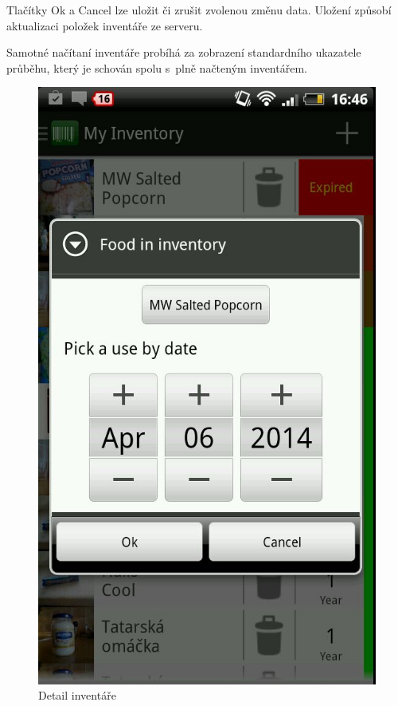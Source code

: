 \documentclass[thesis=B,czech]{FITthesis}[2013/10/20]
\begin{document}
Tlačítky Ok a Cancel lze uložit či zrušit zvolenou změnu data. Uložení způsobí aktualizaci položek inventáře ze serveru.

Samotné načítaní inventáře probíhá za zobrazení standardního ukazatele průběhu, který je schován spolu s~plně načteným inventářem.

\begin{figure}[H]
  \centering
  \includegraphics[scale=0.4]{screenshots/app_inventory_detail.jpg}
  \caption{Detail inventáře}
  \label{fig:AppInventoryDetail}
\end{figure}
\end{document}
